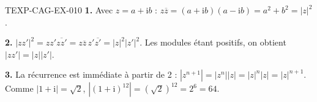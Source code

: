 \begin{corrige}{TEXP-CAG-EX-010}
\textbf{1.} Avec $z=a+\mathrm{i}b$ :
$z\overline{z}=(a+\mathrm{i}b)(a-\mathrm{i}b)=a^2+b^2=|z|^2$.

\textbf{2.} $|zz'|^2=zz'\overline{zz'}=z\overline{z}\,z'\overline{z'}
=|z|^2|z'|^2$. Les modules étant positifs, on obtient $|zz'|=|z||z'|$.

\textbf{3.} La récurrence est immédiate à partir de 2 :
$|z^{n+1}|=|z^n||z|=|z|^n|z|=|z|^{n+1}$. Comme $|1+\mathrm{i}|=\sqrt2$,
$\left|(1+\mathrm{i})^{12}\right|=(\sqrt2)^{12}=2^6=64$.
\end{corrige}
